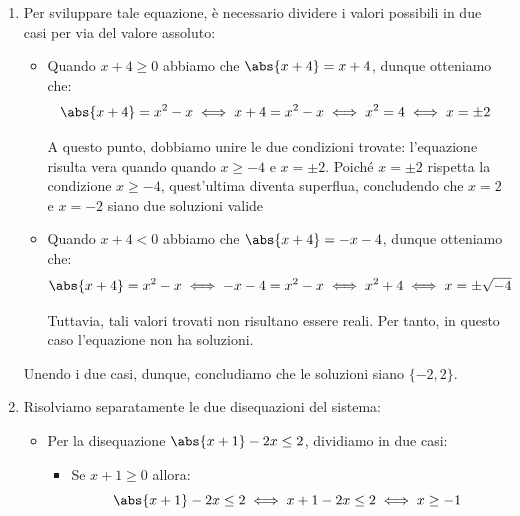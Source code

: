 \documentclass[a4paper, 12pt]{report}
\begin{document}
\begin{enumerate}
        concludendo che $4 x^3 + \frac{2}{3}x^2 + 12 x + 2 = \rbk{x+\frac{1}{6}}(4x^2+12) = 4\rbk{x+\frac{1}{6}}(x^2+3)$. A questo punto, tramite la formula quadratica notiamo che:
        \[x_{1,2} = \frac{0 \pm \sqrt{0 - 4(12)}}{2} = \pm \frac{\sqrt{-48}}{2}\]
        la quali però non risultano essere valori reali in quanto la radice è definita solo per valori reali non negativi. Per tanto, tale polinomio è in realtà irriducibile in $\R$, concludendo che l'unica soluzione reale sia $x = -\frac{1}{6}$. 

        \newpage

        \item Per sviluppare tale equazione, è necessario dividere i valori possibili in due casi per via del valore assoluto:
        \begin{itemize}
            \item Quando $x+4 \geq 0$ abbiamo che $\abs{x+4} = x+4$, dunque otteniamo che:
            \[\abs{x+4} = x^2 - x \iff x+4 = x^2-x \iff x^2 = 4 \iff x = \pm 2\]

            A questo punto, dobbiamo unire le due condizioni trovate: l'equazione risulta vera quando quando $x \geq -4$ e $x = \pm 2$. Poiché $x = \pm 2$ rispetta la condizione $x \geq -4$, quest'ultima diventa superflua, concludendo che $x = 2$ e $x = -2$ siano due soluzioni valide
            
            \item Quando $x+4 < 0$ abbiamo che $\abs{x+4} = -x-4$, dunque otteniamo che:
            \[\abs{x+4} = x^2 - x \iff -x-4 = x^2-x \iff x^2 + 4 \iff x = \pm \sqrt{-4}\]

            Tuttavia, tali valori trovati non risultano essere reali. Per tanto, in questo caso l'equazione non ha soluzioni.
        \end{itemize}

        Unendo i due casi, dunque, concludiamo che le soluzioni siano $\{-2, 2\}$.

        \item Risolviamo separatamente le due disequazioni del sistema:
        
        \begin{itemize}
        
            \item Per la disequazione $\abs{x+1} - 2x \leq 2$, dividiamo in due casi:
            \begin{itemize}
                \item Se $x +1 \geq 0$ allora:
                \[\abs{x+1} - 2x \leq 2 \iff x+1 - 2x \leq 2 \iff x \geq -1 \]
                

\end{itemize}
\end{itemize}
\end{enumerate}
\end{document}

